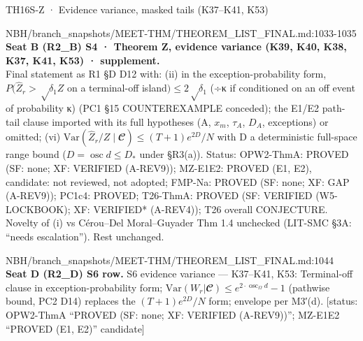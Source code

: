 \begin{card}{TH16}{S-Z · Evidence variance, masked tails (K37–K41, K53)}
\begin{stmt}{NBH/branch_snapshots/MEET-THM/THEOREM_LIST_FINAL.md:1033-1035}
\textbf{Seat B (R2\_B) S4 · Theorem Z, evidence variance (K39, K40, K38, K37, K41, K53) · supplement.}\\
Final statement as R1 §D D12 with: (ii) in the exception-probability form, $P(\hat{Z}_r > √δ_1 Z$ on a terminal-off island$) ≤ 2√δ_1$ (÷κ if conditioned on an off event of probability κ) (PC1 §15 COUNTEREXAMPLE conceded); the E1/E2 path-tail clause imported with its full hypotheses (A, $x_m$, $τ_A$, $D_A$, exceptions) or omitted; (vi) $\mathrm{Var}(\hat{Z}_r/Z \mid 𝓒) ≤ (T+1)e^{2D}/N$ with D a deterministic full-space range bound ($D = \operatorname{osc} d ≤ D_*$ under §R3(a)). Status: OPW2-ThmA: PROVED (SF: none; XF: VERIFIED (A-REV9)); MZ-E1E2: PROVED (E1, E2), candidate: not reviewed, not adopted; FMP-Na: PROVED (SF: none; XF: GAP (A-REV9)); PC1c4: PROVED; T26-ThmA: PROVED (SF: VERIFIED (W5-LOCKBOOK); XF: VERIFIED* (A-REV4)); T26 overall CONJECTURE. Novelty of (i) vs Cérou–Del Moral–Guyader Thm 1.4 unchecked (LIT-SMC §3A: ``needs escalation''). Rest unchanged.
\end{stmt}

\begin{stmt}{NBH/branch_snapshots/MEET-THM/THEOREM_LIST_FINAL.md:1044}
\textbf{Seat D (R2\_D) S6 row.} S6 evidence variance — K37–K41, K53: Terminal-off clause in exception-probability form; $\mathrm{Var}(W_r|𝓒) ≤ e^{2\cdot\operatorname{osc}_Ω d} − 1$ (pathwise bound, PC2 D14) replaces the $(T+1)e^{2D}/N$ form; envelope per M3′(d). [status: OPW2-ThmA ``PROVED (SF: none; XF: VERIFIED (A-REV9))''; MZ-E1E2 ``PROVED (E1, E2)'' candidate]
\end{stmt}


\end{card}
